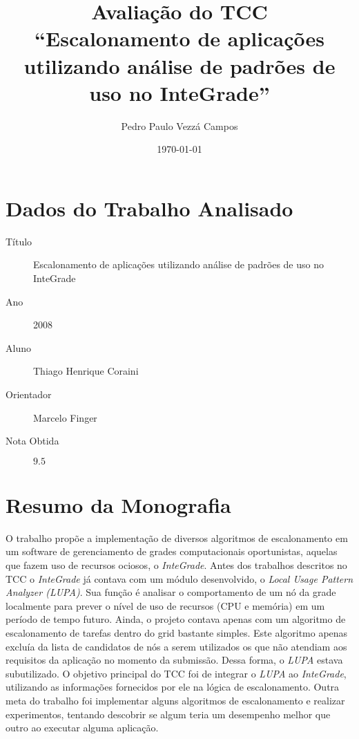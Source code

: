 \documentclass{article}
\begin{document}
\author{Pedro Paulo Vezzá Campos}
\title{Avaliação do TCC \\ ``Escalonamento de aplicações utilizando análise de padrões de uso no InteGrade''}
\date{\today}
\maketitle

\section{Dados do Trabalho Analisado}
	\begin{description}
		\item[Título] Escalonamento de aplicações utilizando análise de padrões de uso no InteGrade
		\item[Ano] 2008
		\item[Aluno] Thiago Henrique Coraini 
		\item[Orientador] Marcelo Finger
		\item[Nota Obtida] $9.5$
	\end{description}

\section{Resumo da Monografia}
	O trabalho propõe a implementação de diversos algoritmos de escalonamento em um software de gerenciamento de grades computacionais oportunistas, aquelas que fazem uso de recursos ociosos, o \emph{InteGrade}. Antes dos trabalhos descritos no TCC o \emph{InteGrade} já contava com um módulo desenvolvido, o \emph{Local Usage Pattern Analyzer (LUPA)}. Sua função é analisar o comportamento de um nó da grade localmente para prever o nível de uso de recursos (CPU e memória) em um período de tempo futuro. Ainda, o projeto contava apenas com um algoritmo de escalonamento de tarefas dentro do grid bastante simples. Este algoritmo apenas excluía da lista de candidatos de nós a serem utilizados os que não atendiam aos requisitos da aplicação no momento da submissão. Dessa forma, o \emph{LUPA} estava subutilizado. O objetivo principal do TCC foi de integrar o \emph{LUPA} ao \emph{InteGrade}, utilizando as informações fornecidos por ele na lógica de escalonamento. Outra meta do trabalho foi implementar alguns algoritmos de escalonamento e realizar experimentos, tentando descobrir se algum teria um desempenho melhor que outro ao executar alguma aplicação.
	
\end{document}
